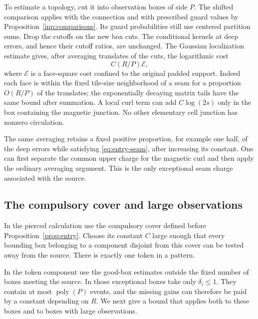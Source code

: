 To estimate a topology, cut it into observation boxes of side $P$.
The shifted comparison \cite[Equation (9.20)]{B}
applies with the connection and with prescribed guard values by
Proposition~\ref{inp:comparisons}. Its guard probabilities still use centered
partition sums. Drop the cutoffs on the new box cuts. The conditional
kernels at deep errors, and hence their cutoff ratios, are unchanged.
The Gaussian localization estimate gives, after averaging translates
of the cuts, the logarithmic cost
\begin{equation}\label{eq:entry-seam}
                         C(R/P)\mathcal E,
\end{equation}
where $\mathcal E$ is a face-square cost confined to the original
padded support. Indeed each face is within the fixed tile-size
neighborhood of a seam for a proportion $O(R/P)$ of the translates;
the exponentially decaying matrix tails have the same bound after
summation. A local curl term can add $C\log(2s)$ only in the box
containing the magnetic junction. No other elementary cell junction
has nonzero circulation.

The same averaging retains a fixed positive proportion, for example
one half, of the deep errors while satisfying
\eqref{eq:entry-seam}, after increasing its constant. One can first
separate the common upper charge for the magnetic curl and then apply
the ordinary averaging argument. This is the only exceptional seam
charge associated with the source.

\subsection{The compulsory cover and large observations}

In the pierced calculation use the compulsory cover defined before
Proposition~\ref{prop:entry}. Choose its constant $C$ large enough that
every bounding box belonging to a component disjoint from this cover
can be tested away from the source. There is exactly one token in a pattern.

In the token component use the good-box estimates outside the fixed
number of boxes meeting the source. In those exceptional boxes take
only $\delta_i\le1$. They contain at most $\operatorname{poly}(P)$
events, and the missing gains can therefore be paid by a constant
depending on $R$. We next give a bound that applies both to these
boxes and to boxes with large observations.

